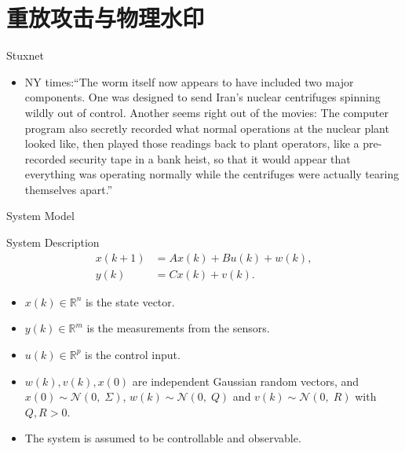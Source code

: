 \documentclass[10pt]{beamer}
\begin{document}
\section{重放攻击与物理水印}

\begin{frame}{Stuxnet}
  \begin{itemize}
    \item NY times:``The worm itself now appears to have included two major components. One was designed to send Iran's nuclear centrifuges spinning wildly out of control. Another seems right out of the movies: The computer program also \alert{secretly recorded what normal operations at the nuclear plant looked like, then played those readings back to plant operators}, like a pre-recorded security tape in a bank heist, so that it would appear that everything was operating normally while the centrifuges were actually tearing themselves apart.''
  \end{itemize}
\end{frame}

\begin{frame}{System Model}
  \begin{block}{System Description}
      \begin{displaymath}
	\begin{split}
	  x(k+1) &= Ax(k)  + Bu(k)+w(k),\\
	  y(k) &= C x(k) + v(k).
	\end{split}
      \end{displaymath}
    \end{block}
    \begin{itemize}
      \item $x(k) \in \mathbb R^n$ is the state vector.
      \item  $y(k) \in \mathbb R^m$ is the measurements from the sensors.
      \item  $u(k) \in \mathbb R^p$ is the control input.
      \item $w(k),v(k),x(0)$ are independent Gaussian random vectors, and $x(0) \sim \mathcal N(0,\;\Sigma)$, $w(k) \sim \mathcal N(0,\;Q)$ and $v(k) \sim \mathcal N(0,\;R)$ with $Q,R>0$.
      \item The system is assumed to be controllable and observable.
    \end{itemize}
  \end{frame}
\end{document}
